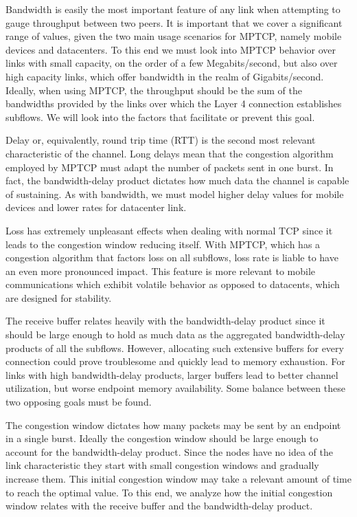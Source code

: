 
Bandwidth is easily the most important feature of any link when attempting to
gauge throughput between two peers. It is important that we cover a significant
range of values, given the two main usage scenarios for MPTCP, namely mobile
devices and datacenters. To this end we must look into MPTCP behavior over
links with small capacity, on the order of a few Megabits/second, but also
over high capacity links, which offer bandwidth in the realm of
Gigabits/second. Ideally, when using MPTCP, the throughput should be the sum
of the bandwidths provided by the links over which the Layer 4 connection
establishes subflows. We will look into the factors that facilitate or prevent
this goal.

Delay or, equivalently, round trip time (RTT) is the second most relevant
characteristic of the channel. Long delays mean that the congestion algorithm
employed by MPTCP must adapt the number of packets sent in one burst. In fact,
the bandwidth-delay product dictates how much data the channel is capable of
sustaining. As with bandwidth, we must model higher delay values for mobile
devices and lower rates for datacenter link.

Loss has extremely unpleasant effects when dealing with normal TCP since it
leads to the congestion window reducing itself. With MPTCP, which has a
congestion algorithm that factors loss on all subflows, loss rate is liable to
have an even more pronounced impact. This feature is more relevant to mobile
communications which exhibit volatile behavior as opposed to datacents, which
are designed for stability.

The receive buffer relates heavily with the bandwidth-delay product since it
should be large enough to hold as much data as the aggregated bandwidth-delay
products of all the subflows. However, allocating such extensive buffers for
every connection could prove troublesome and quickly lead to memory
exhaustion. For links with high bandwidth-delay products, larger buffers lead
to better channel utilization, but worse endpoint memory availability. Some
balance between these two opposing goals must be found.

The congestion window dictates how many packets may be sent by an endpoint in
a single burst. Ideally the congestion window should be large enough to
account for the bandwidth-delay product. Since the nodes have no idea of the
link characteristic they start with small congestion windows and gradually
increase them. This initial congestion window may take a relevant amount of
time to reach the optimal value. To this end, we analyze how the initial
congestion window relates with the receive buffer and the bandwidth-delay
product.
